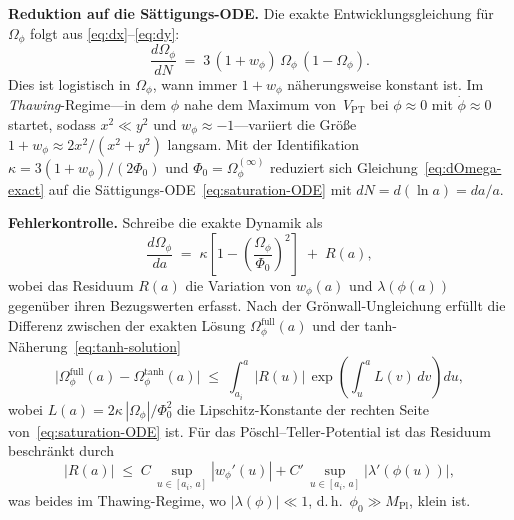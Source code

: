 \documentclass[12pt,a4paper]{article}
\theoremstyle{definition}
\theoremstyle{plain}
\theoremstyle{remark}
\begin{document}
\medskip
\noindent\textbf{Reduktion auf die S\"attigungs-ODE.}\;
Die exakte Entwicklungsgleichung f\"ur $\Omega_\phi$ folgt aus
\eqref{eq:dx}--\eqref{eq:dy}:
\begin{equation}\label{eq:dOmega-exact}
  \frac{d\Omega_\phi}{dN}
  \;=\; 3\,(1 + w_\phi)\,\Omega_\phi\,(1 - \Omega_\phi).
\end{equation}
Dies ist logistisch in $\Omega_\phi$, wann immer $1 + w_\phi$
n\"aherungsweise konstant ist. Im \emph{Thawing}-Regime---in dem $\phi$
nahe dem Maximum von~$V_{\mathrm{PT}}$ bei $\phi \approx 0$ mit
$\dot\phi \approx 0$ startet, sodass $x^2 \ll y^2$ und
$w_\phi \approx -1$---variiert die Gr\"o\ss e
$1 + w_\phi \approx 2x^2/(x^2 + y^2)$ langsam. Mit der Identifikation
$\kappa = 3(1 + w_\phi)/(2\Phi_0)$ und $\Phi_0 = \Omega_\phi^{(\infty)}$
reduziert sich Gleichung~\eqref{eq:dOmega-exact} auf die
S\"attigungs-ODE~\eqref{eq:saturation-ODE} mit $dN = d(\ln a) = da/a$.

\medskip
\noindent\textbf{Fehlerkontrolle.}\;
Schreibe die exakte Dynamik als
\begin{equation}\label{eq:Omega-rest}
  \frac{d\Omega_\phi}{da}
  \;=\; \kappa\!\left[1 - \left(\frac{\Omega_\phi}{\Phi_0}\right)^{\!2}\right]
  \;+\; R(a),
\end{equation}
wobei das Residuum $R(a)$ die Variation von $w_\phi(a)$ und
$\lambda(\phi(a))$ gegen\"uber ihren Bezugswerten erfasst. Nach der
Gr\"onwall-Ungleichung erf\"ullt die Differenz zwischen der exakten
L\"osung $\Omega_\phi^{\mathrm{full}}(a)$ und der
tanh-N\"aherung~\eqref{eq:tanh-solution}
\begin{equation}\label{eq:Gronwall-error}
  \bigl|\Omega_\phi^{\mathrm{full}}(a)
  - \Omega_\phi^{\mathrm{tanh}}(a)\bigr|
  \;\le\;
  \int_{a_i}^{a} |R(u)|\,
  \exp\!\left(\int_u^a L(v)\,dv\right) du,
\end{equation}
wobei $L(a) = 2\kappa\,|\Omega_\phi|/\Phi_0^2$ die Lipschitz-Konstante
der rechten Seite von~\eqref{eq:saturation-ODE} ist. F\"ur das
P\"oschl--Teller-Potential ist das Residuum beschr\"ankt durch
\begin{equation}
  |R(a)| \;\le\;
  C\,\sup_{u \in [a_i,\,a]}|w_\phi'(u)|
  + C'\,\sup_{u \in [a_i,\,a]}|\lambda'(\phi(u))|,
\end{equation}
was beides im Thawing-Regime, wo $|\lambda(\phi)| \ll 1$, d.\,h.\
$\phi_0 \gg M_{\mathrm{Pl}}$, klein ist.
\end{document}
